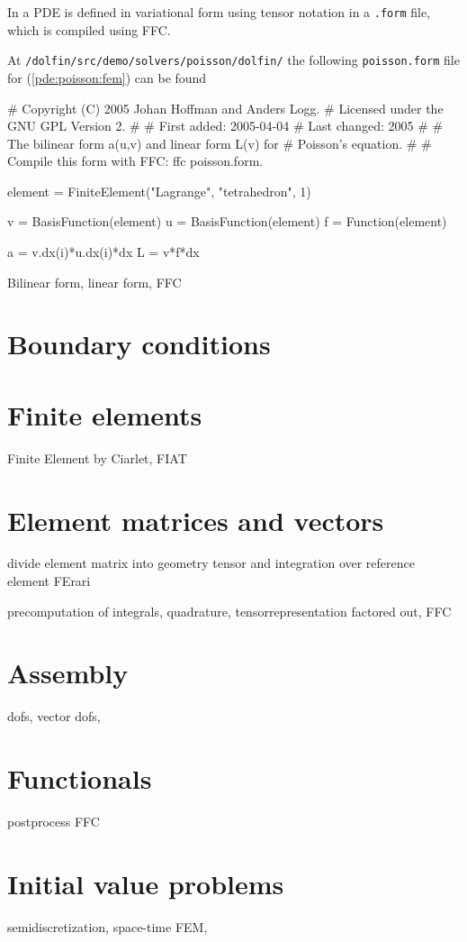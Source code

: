 In \dolfin{} a PDE is defined in variational form using tensor notation 
in a \texttt{.form} file, which is compiled using FFC. 

At \texttt{/dolfin/src/demo/solvers/poisson/dolfin/} the following 
\texttt{poisson.form} file for (\ref{pde:poisson:fem}) can be found  
\begin{code}
# Copyright (C) 2005 Johan Hoffman and Anders Logg.
# Licensed under the GNU GPL Version 2.
#
# First added:  2005-04-04
# Last changed: 2005
#
# The bilinear form a(u,v) and linear form L(v) for
# Poisson's equation.
#
# Compile this form with FFC: ffc poisson.form.

element = FiniteElement("Lagrange", "tetrahedron", 1)

v = BasisFunction(element)
u = BasisFunction(element)
f = Function(element)

a = v.dx(i)*u.dx(i)*dx
L = v*f*dx
\end{code}


Bilinear form, linear form, FFC

\section{Boundary conditions}

\section{Finite elements}

Finite Element by Ciarlet, FIAT 

\section{Element matrices and vectors} 

divide element matrix into geometry tensor and integration 
over reference element FErari

precomputation of integrals, quadrature, tensorrepresentation factored out, FFC 

\section{Assembly}

dofs, vector dofs, 

\section{Functionals}

postprocess FFC 


\section{Initial value problems}

semidiscretization, space-time FEM, 



\dolfin{}

